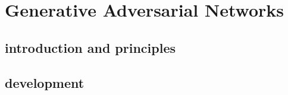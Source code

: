 \chapter{Generative Adversarial Networks}


\section{introduction and principles}

\section{development}